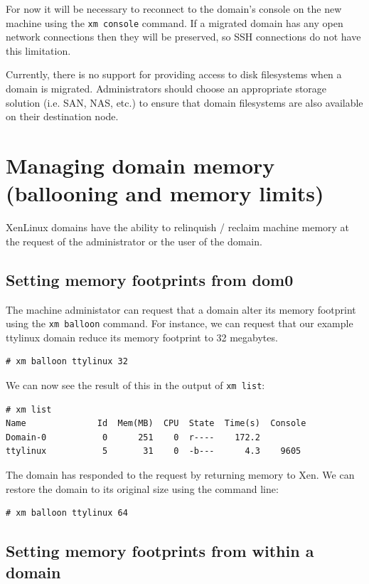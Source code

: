\documentclass[11pt,twoside,final,openright]{xenstyle}
\begin{document}
For now it will be necessary to reconnect to the domain's console on
the new machine using the {\tt xm console} command.  If a migrated
domain has any open network connections then they will be preserved,
so SSH connections do not have this limitation.

Currently, there is no support for providing access to disk
filesystems when a domain is migrated.  Administrators should choose
an appropriate storage solution (i.e. SAN, NAS, etc.) to ensure that
domain filesystems are also available on their destination node.

\section{Managing domain memory (ballooning and memory limits)}

XenLinux domains have the ability to relinquish / reclaim machine
memory at the request of the administrator or the user of the domain.

\subsection{Setting memory footprints from dom0}

The machine administator can request that a domain alter its memory
footprint using the {\tt xm balloon} command.  For instance, we can
request that our example ttylinux domain reduce its memory footprint
to 32 megabytes.

\begin{verbatim}
# xm balloon ttylinux 32
\end{verbatim}

We can now see the result of this in the output of {\tt xm list}:

\begin{verbatim}
# xm list
Name              Id  Mem(MB)  CPU  State  Time(s)  Console
Domain-0           0      251    0  r----    172.2        
ttylinux           5       31    0  -b---      4.3    9605
\end{verbatim}

The domain has responded to the request by returning memory to Xen. We
can restore the domain to its original size using the command line:

\begin{verbatim}
# xm balloon ttylinux 64
\end{verbatim}

\subsection{Setting memory footprints from within a domain}
\end{document}
